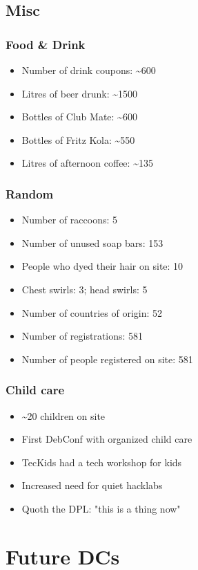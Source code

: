\documentclass[t]{beamer}
\begin{document}
\subsection{Misc}

\begin{frame}
	\frametitle{Food \& Drink}
	\begin{itemize}
		\item Number of drink coupons: \~{}600
		\item Litres of beer drunk: \~{}1500
		\item Bottles of Club Mate: \~{}600
		\item Bottles of Fritz Kola: \~{}550
		\item Litres of afternoon coffee: \~{}135
	\end{itemize}
\end{frame}

\begin{frame}
	\frametitle{Random}
	\begin{itemize}
		\item Number of raccoons: 5
		\item Number of unused soap bars: 153
		\item People who dyed their hair on site: 10
		\item Chest swirls: 3; head swirls: 5
		\item Number of countries of origin: 52
		\item Number of registrations: 581
		\item Number of people registered on site: 581
	\end{itemize}
\end{frame}

\begin{frame}
	\frametitle{Child care}
	\begin{itemize}
		\item \~{}20 children on site
		\item First DebConf with organized child care
		\item TecKids had a tech workshop for kids
		\item Increased need for quiet hacklabs
		\item Quoth the DPL: "this is a thing now"
	\end{itemize}
\end{frame}

\section{Future DCs}
\end{document}
